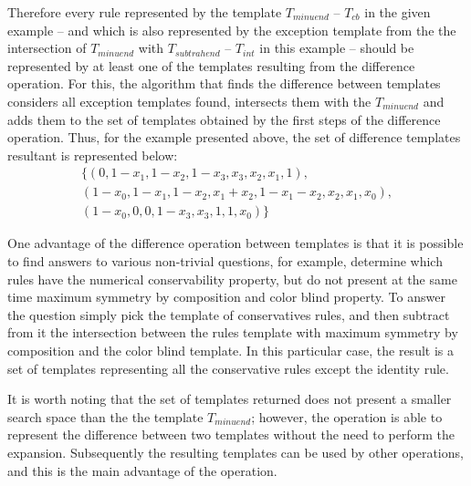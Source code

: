 \documentclass{llncs}
\begin{document}
Therefore every rule represented  by the template $T_{minuend}$ -- $T_{cb}$ in the given example -- and which is also represented by the exception template from the the intersection of $T_{minuend}$ with $T_{subtrahend}$ -- $T_{int}$ in this example -- should be represented by at least one of the templates resulting from the difference operation. For this, the algorithm that finds the difference between templates considers all exception templates found, intersects them with the $T_{minuend}$ and adds them to the set of templates obtained by the first steps of the difference operation. Thus, for the example presented above, the set of difference templates resultant is represented below:\begin{displaymath}
\begin{split}
\{(0, 1 - x_1, 1 - x_2, 1 - x_3, x_3, x_2, x_1, 1), \\
(1 - x_0, 1 - x_1, 1 - x_2, x_1 + x_2, 1 - x_1 - x_2, x_2, x_1, x_0), \\
(1 - x_0, 0, 0, 1 - x_3, x_3, 1, 1, x_0)\}
\label{eq:differenceR}
\end{split}
\end{displaymath}

One advantage of the difference operation between templates is that it is possible to find answers to various non-trivial questions, for example, determine which rules have the numerical conservability property, but do not present at the same time maximum symmetry by composition and color blind property. %
 To answer the question simply pick the template of conservatives rules, and then subtract from it the intersection between the rules template with maximum symmetry by composition and the color blind template. In this particular case, the result is a set of templates representing all the conservative rules except the identity rule. %

It is worth noting that the set of templates returned does not present a smaller search space than the the template $T_{minuend}$; however, the operation is able to represent the difference between two templates without the need to perform the expansion. Subsequently the resulting templates can be used by other operations, and this is the main advantage of the operation.
\end{document}
